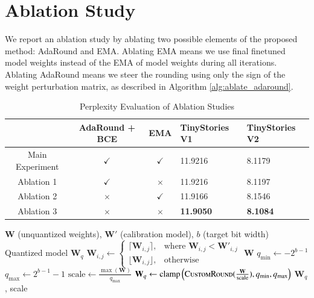 \documentclass[../main.tex]{subfiles}
\begin{document}
\section{Ablation Study}
We report an ablation study by ablating two possible elements of the proposed method: AdaRound and EMA. Ablating EMA means we use final finetuned model weights instead of the EMA of model weights during all iterations. Ablating AdaRound means we steer the rounding using only the sign of the weight perturbation matrix, as described in Algorithm \ref{alg:ablate_adaround}.

\begin{table}[H]
\centering
\caption{Perplexity Evaluation of Ablation Studies}
\label{tab:adaround_ablation_study}
\begin{tabular}{|c|c|c|l|l|}
\hline
& AdaRound + BCE & EMA          & TinyStories V1 & TinyStories V2  \\ \hline
Main Experiment & $\checkmark$ & $\checkmark$ & 11.9216        & 8.1179          \\ \hline
Ablation 1 & $\checkmark$ & $\times$     & 11.9216        & 8.1197          \\ \hline
Ablation 2 & $\times$     & $\checkmark$ & 11.9166        & 8.1546          \\ \hline
Ablation 3 & $\times$     & $\times$     & \textbf{11.9050}        & \textbf{8.1084} \\ \hline
\end{tabular}
\end{table}

\begin{algorithm}[H]
\caption{Gradient-based Steering without AdaRound}\label{alg:ablate_adaround}
\begin{algorithmic}[1]
\Require $\mathbf{W}$ (unquantized weights), $\mathbf{W}'$ (calibration model), $b$ (target bit width)
\Ensure Quantized model $\mathbf{W}_q$
  \State $\mathbf{W}_{i,j} \gets \begin{cases}
    \lceil \mathbf{W}_{i, j} \rceil, &\text{where } \mathbf{W}_{i, j} < \mathbf{W}'_{i, j} \\
    \lfloor \mathbf{W}_{i, j} \rfloor, &\text{otherwise}
\end{cases}$
  \State \Return $\mathbf{W}$
\EndFunction
\State $q_{\text{min}} \gets -2^{b - 1}$
\State $q_{\text{max}} \gets 2^{b - 1} - 1$
\State $\text{scale} \gets \frac{\max(\mathbf{W})}{q_{\text{max}}}$
\State $\mathbf{W}_q \gets \text{clamp}\left(\textsc{CustomRound}(\frac{\mathbf{W}}{\text{scale}}), q_\text{min}, q_\text{max}\right)$
\State \Return $\mathbf{W}_q$, scale
\end{algorithmic}
\end{algorithm}
\end{document}
